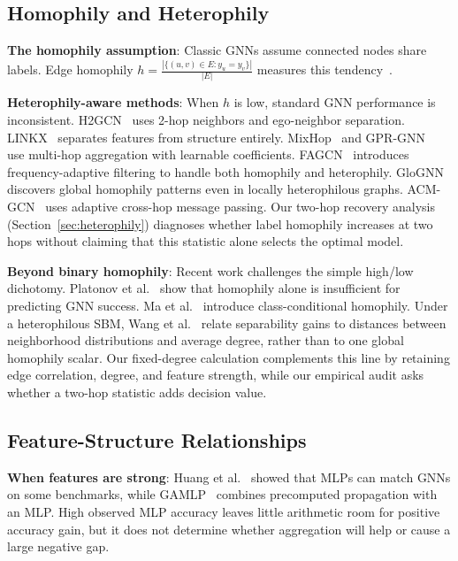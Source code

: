 \subsection{Homophily and Heterophily}

\textbf{The homophily assumption}: Classic GNNs assume connected nodes share labels. Edge homophily $h = \frac{|\{(u,v) \in E : y_u = y_v\}|}{|E|}$ measures this tendency~\cite{mcpherson2001homophily}.

\textbf{Heterophily-aware methods}: When $h$ is low, standard GNN performance is inconsistent. H2GCN~\cite{zhu2020beyond} uses 2-hop neighbors and ego-neighbor separation. LINKX~\cite{luan2022linkx} separates features from structure entirely. MixHop~\cite{abu2019mixhop} and GPR-GNN~\cite{chien2021gprgnn} use multi-hop aggregation with learnable coefficients. FAGCN~\cite{fagcn2021} introduces frequency-adaptive filtering to handle both homophily and heterophily. GloGNN~\cite{li2022glognn} discovers global homophily patterns even in locally heterophilous graphs. ACM-GCN~\cite{acmgcn2024} uses adaptive cross-hop message passing. Our two-hop recovery analysis (Section~\ref{sec:heterophily}) diagnoses whether label homophily increases at two hops without claiming that this statistic alone selects the optimal model.

\textbf{Beyond binary homophily}: Recent work challenges the simple high/low dichotomy. Platonov et al.~\cite{platonov2023heterophily} show that homophily alone is insufficient for predicting GNN success. Ma et al.~\cite{ma2021homophily} introduce class-conditional homophily. Under a heterophilous SBM, Wang et al.~\cite{pmlr-v235-wang24u} relate separability gains to distances between neighborhood distributions and average degree, rather than to one global homophily scalar. Our fixed-degree calculation complements this line by retaining edge correlation, degree, and feature strength, while our empirical audit asks whether a two-hop statistic adds decision value.

\subsection{Feature-Structure Relationships}

\textbf{When features are strong}: Huang et al.~\cite{huang2021mlp} showed that MLPs can match GNNs on some benchmarks, while GAMLP~\cite{zhang2021gamlp} combines precomputed propagation with an MLP. High observed MLP accuracy leaves little arithmetic room for positive accuracy gain, but it does not determine whether aggregation will help or cause a large negative gap.

